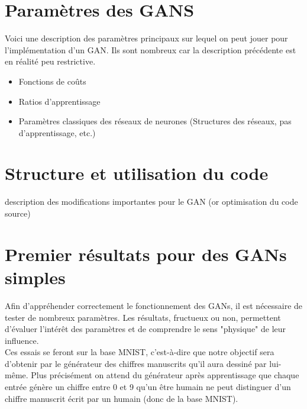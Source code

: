 \section{Paramètres des GANS}

	Voici une description des paramètres principaux sur lequel on peut jouer pour l'implémentation d'un GAN. Ils sont nombreux car la description précédente est en réalité peu restrictive.

	\begin{itemize}
	 	\item Fonctions de coûts
	 	\item Ratios d'apprentissage
	 	\item Paramètres classiques des réseaux de neurones (Structures des réseaux, pas d'apprentissage, etc.)
	\end{itemize}


\section{Structure et utilisation du code}
	{description des modifications importantes pour le GAN (or optimisation du code source)}


\section{Premier résultats pour des GANs simples}
	Afin d'appréhender correctement le fonctionnement des GANs, il est nécessaire de tester de nombreux paramètres. Les résultats, fructueux ou non, permettent d'évaluer l'intérêt des paramètres et de comprendre le sens "physique" de leur influence.\\
	Ces essais se feront sur la base MNIST, c'est-à-dire que notre objectif sera d'obtenir par le générateur des chiffres manuscrits qu'il aura dessiné par lui-même. Plus précisément on attend du générateur après apprentissage que chaque entrée génère un chiffre entre 0 et 9 qu'un être humain ne peut distinguer d'un chiffre manuscrit écrit par un humain (donc de la base MNIST).

